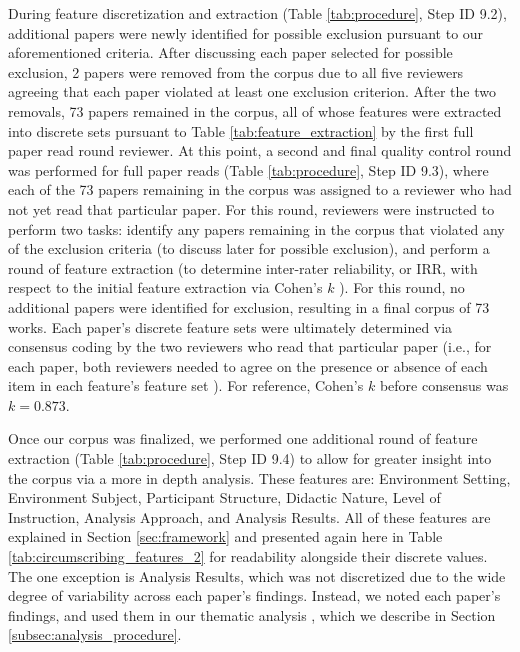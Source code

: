 \documentclass[manuscript,screen,review]{acmart}
\begin{document}
During feature discretization and extraction (Table \ref{tab:procedure}, Step ID 9.2), additional papers were newly identified for possible exclusion pursuant to our aforementioned criteria. After discussing each paper selected for possible exclusion, 2 papers were removed from the corpus due to all five reviewers agreeing that each paper violated at least one exclusion criterion. After the two removals, 73 papers remained in the corpus, all of whose features were extracted into discrete sets pursuant to Table \ref{tab:feature_extraction} by the first full paper read round reviewer. At this point, a second and final quality control round was performed for full paper reads (Table \ref{tab:procedure}, Step ID 9.3), where each of the 73 papers remaining in the corpus was assigned to a reviewer who had not yet read that particular paper. For this round, reviewers were instructed to perform two tasks: identify any papers remaining in the corpus that violated any of the exclusion criteria (to discuss later for possible exclusion), and perform a round of feature extraction (to determine inter-rater reliability, or IRR, with respect to the initial feature extraction via Cohen's $k$ \cite{cohen1960coefficient}). For this round, no additional papers were identified for exclusion, resulting in a final corpus of 73 works. Each paper's discrete feature sets were ultimately determined via consensus coding \cite{chinh2019ways} by the two reviewers who read that particular paper (i.e., for each paper, both reviewers needed to agree on the presence or absence of each item in each feature's feature set ). For reference, Cohen's $k$ before consensus was $k=0.873$. 

Once our corpus was finalized, we performed one additional round of feature extraction (Table \ref{tab:procedure}, Step ID 9.4) to allow for greater insight into the corpus via a more in depth analysis. These features are: Environment Setting, Environment Subject, Participant Structure, Didactic Nature, Level of Instruction, Analysis Approach, and Analysis Results. All of these features are explained in Section \ref{sec:framework} and presented again here in Table \ref{tab:circumscribing_features_2} for readability alongside their discrete values. The one exception is Analysis Results, which was not discretized due to the wide degree of variability across each paper's findings. Instead, we noted each paper's findings, and used them in our thematic analysis \cite{braun2006using}, which we describe in Section \ref{subsec:analysis_procedure}. 
\end{document}
